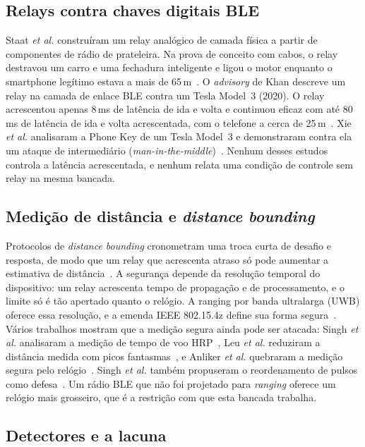 \documentclass{ieeeaccess}
\begin{document}
\subsection{Relays contra chaves digitais BLE}

Staat \emph{et al.} construíram um relay analógico de camada física a partir de componentes de rádio de prateleira. Na prova de conceito com cabos, o relay destravou um carro e uma fechadura inteligente e ligou o motor enquanto o smartphone legítimo estava a mais de 65\,m~\cite{b3}. O \emph{advisory} de Khan descreve um relay na camada de enlace BLE contra um Tesla Model~3 (2020). O relay acrescentou apenas 8\,ms de latência de ida e volta e continuou eficaz com até 80\,ms de latência de ida e volta acrescentada, com o telefone a cerca de 25\,m~\cite{b4}. Xie \emph{et al.} analisaram a Phone Key de um Tesla Model~3 e demonstraram contra ela um ataque de intermediário (\emph{man-in-the-middle})~\cite{b25}. Nenhum desses estudos controla a latência acrescentada, e nenhum relata uma condição de controle sem relay na mesma bancada.

\subsection{Medição de distância e \emph{distance bounding}}

Protocolos de \emph{distance bounding} cronometram uma troca curta de desafio e resposta, de modo que um relay que acrescenta atraso só pode aumentar a estimativa de distância~\cite{b16,b27,b28}. A segurança depende da resolução temporal do dispositivo: um relay acrescenta tempo de propagação e de processamento, e o limite só é tão apertado quanto o relógio. A ranging por banda ultralarga (UWB) oferece essa resolução, e a emenda IEEE 802.15.4z define sua forma segura~\cite{b30}. Vários trabalhos mostram que a medição segura ainda pode ser atacada: Singh \emph{et al.} analisaram a medição de tempo de voo HRP~\cite{b6}, Leu \emph{et al.} reduziram a distância medida com picos fantasmas~\cite{b7}, e Anliker \emph{et al.} quebraram a medição segura pelo relógio~\cite{b8}. Singh \emph{et al.} também propuseram o reordenamento de pulsos como defesa~\cite{b5}. Um rádio BLE que não foi projetado para \emph{ranging} oferece um relógio mais grosseiro, que é a restrição com que esta bancada trabalha.

\subsection{Detectores e a lacuna}
\end{document}
